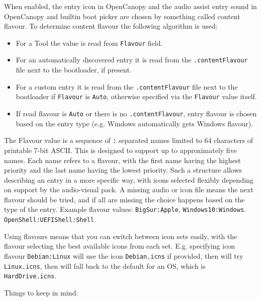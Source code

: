 \documentclass[]{article}
\providecommand{\tightlist}{%
  \setlength{\itemsep}{0pt}\setlength{\parskip}{0pt}}
\begin{document}
\begin{enumerate}
\begin{itemize}
  When enabled, the entry icon in OpenCanopy and the audio assist entry sound in OpenCanopy
  and builtin boot picker are chosen by something called content flavour. To determine
  content flavour the following algorithm is used:

    \begin{itemize}
    \tightlist
      \item For a Tool the value is read from \texttt{Flavour} field.
      \item For an automatically discovered entry it is read from the \texttt{.contentFlavour}
      file next to the bootloader, if present.
      \item For a custom entry it is read from the \texttt{.contentFlavour} file next to the
      bootloader if \texttt{Flavour} is \texttt{Auto}, otherwise specified via the \texttt{Flavour}
      value itself.
      \item If read flavour is \texttt{Auto} or there is no \texttt{.contentFlavour}, entry
      flavour is chosen based on the entry type (e.g. Windows automatically gets Windows flavour).
    \end{itemize}
    \medskip

  The Flavour value is a sequence of \texttt{:} separated names limited to 64 characters of
  printable 7-bit ASCII. This is designed to support up to approximately five names. Each name
  refers to a flavour, with the first name having the highest priority and the last name having
  the lowest priority. Such a structure allows describing an entry in a more specific way, with
  icons selected flexibly depending on support by the audio-visual pack. A missing audio or icon
  file means the next flavour should be tried, and if all are missing the choice happens based
  on the type of the entry.
  Example flavour values: \texttt{BigSur:Apple}, \texttt{Windows10:Windows}. \texttt{OpenShell:UEFIShell:Shell}.
  \medskip

  Using flavours means that you can switch between icon sets easily, with the flavour selecting
  the best available icons from each set. E.g. specifying icon flavour \texttt{Debian:Linux}
  will use the icon \texttt{Debian.icns} if provided, then will try \texttt{Linux.icns}, then will
  fall back to the default for an OS, which is \texttt{HardDrive.icns}.
  \medskip

  Things to keep in mind:


\end{itemize}
\end{enumerate}
\end{document}
